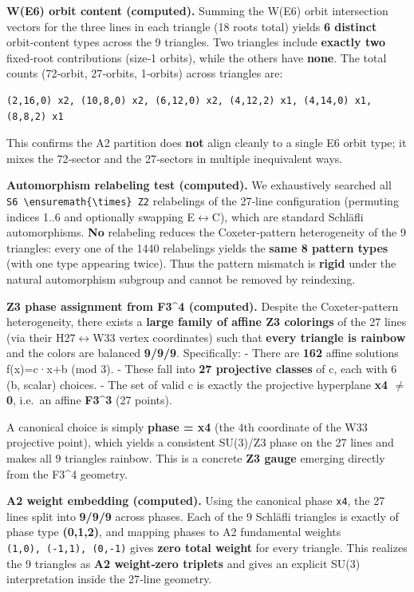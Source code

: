\documentclass[11pt]{article}
\newcounter{none}
\begin{document}
\textbf{W(E6) orbit content (computed).} Summing the W(E6) orbit
intersection vectors for the three lines in each triangle (18 roots
total) yields \textbf{6 distinct} orbit‑content types across the 9
triangles. Two triangles include \textbf{exactly two} fixed‑root
contributions (size‑1 orbits), while the others have \textbf{none}. The
total counts (72‑orbit, 27‑orbits, 1‑orbits) across triangles are:

\begin{verbatim}
(2,16,0) x2, (10,8,0) x2, (6,12,0) x2, (4,12,2) x1, (4,14,0) x1, (8,8,2) x1
\end{verbatim}

This confirms the A2 partition does \textbf{not} align cleanly to a
single E6 orbit type; it mixes the 72‑sector and the 27‑sectors in
multiple inequivalent ways.

\textbf{Automorphism relabeling test (computed).} We exhaustively
searched all
\texttt{S6\ \textbackslash{}ensuremath\{\textbackslash{}times\}\ Z2}
relabelings of the 27‑line configuration (permuting indices 1..6 and
optionally swapping E\ensuremath{\leftrightarrow}C), which are standard
Schläfli automorphisms. \textbf{No} relabeling reduces the
Coxeter‑pattern heterogeneity of the 9 triangles: every one of the 1440
relabelings yields the \textbf{same 8 pattern types} (with one type
appearing twice). Thus the pattern mismatch is \textbf{rigid} under the
natural automorphism subgroup and cannot be removed by reindexing.

\textbf{Z3 phase assignment from F3\^{}4 (computed).} Despite the
Coxeter‑pattern heterogeneity, there exists a \textbf{large family of
affine Z3 colorings} of the 27 lines (via their
H27\ensuremath{\leftrightarrow}W33 vertex coordinates) such that
\textbf{every triangle is rainbow} and the colors are balanced
\textbf{9/9/9}. Specifically: - There are \textbf{162} affine solutions
f(x)=c·x+b (mod 3). - These fall into \textbf{27 projective classes} of
c, each with 6 (b, scalar) choices. - The set of valid c is exactly the
projective hyperplane \textbf{x4 \ensuremath{\neq} 0}, i.e.~an affine
\textbf{F3\^{}3} (27 points).

A canonical choice is simply \textbf{phase = x4} (the 4th coordinate of
the W33 projective point), which yields a consistent SU(3)/Z3 phase on
the 27 lines and makes all 9 triangles rainbow. This is a concrete
\textbf{Z3 gauge} emerging directly from the F3\^{}4 geometry.

\textbf{A2 weight embedding (computed).} Using the canonical phase
\texttt{x4}, the 27 lines split into \textbf{9/9/9} across phases. Each
of the 9 Schläfli triangles is exactly of phase type \textbf{(0,1,2)},
and mapping phases to A2 fundamental weights
\texttt{(1,0),\ (-1,1),\ (0,-1)} gives \textbf{zero total weight} for
every triangle. This realizes the 9 triangles as \textbf{A2 weight‑zero
triplets} and gives an explicit SU(3) interpretation inside the 27‑line
geometry.
\end{document}
